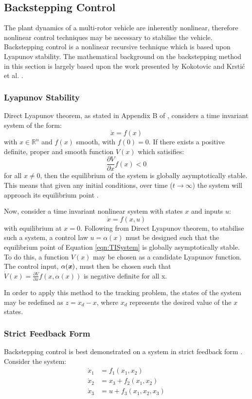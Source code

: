 \subsection{Backstepping Control}\label{section:BacksteppingBackground}
The plant dynamics of a multi-rotor vehicle are inherently nonlinear, therefore nonlinear control techniques may be necessary to stabilise the vehicle. Backstepping control is a nonlinear recursive technique which is based upon Lyapunov stability. The mathematical background on the backstepping method in this section is largely based upon the work presented by Kokotovic \cite{1992a} and Krsti\'c et al. \cite{Krstic1995}.

\subsubsection{Lyapunov Stability}
Direct Lyapunov theorem, as stated in Appendix B of \cite{Isidori1995}, considers a time invariant system of the form:
\[\dot{x}=f(x)\]
with $x\in\mathbb{R}^{n}$ and $f(x)$ smooth, with $f(0)=0$. If there exists a positive definite, proper and smooth function $V(x)$ which satisifies:
\[\frac{\partial V}{\partial x}f(x)<0\]
for all $x\neq0$, then the equilibrium of the system is globally asymptotically stable. This means that given any initial conditions, over time ($t\rightarrow\infty$) the system will approach its equilibrium point \cite{Chen1999}. 

Now, consider a time invariant nonlinear system with states $x$ and inputs $u$:
\begin{equation}\label{eqn:TISystem}
\dot{x}=f(x,u)
\end{equation}
with equilibrium at $x=0$. Following from Direct Lyapunov theorem, to stabilise such a system, a control law $u=\alpha(x)$ must be designed such that the equilibrium point of Equation \ref{eqn:TISystem} is globally asymptotically stable. To do this, a function $V(x)$ may be chosen as a candidate Lyapunov function. The control input, $\alpha(\textbf{\textit{x}})$, must then be chosen such that $\dot{V}(x)=\frac{\partial V}{\partial x}f(x,\alpha(x))$ is negative definite for all x. 

In order to apply this method to the tracking problem, the states of the system may be redefined as $z=x_{d}-x$, where $x_{d}$ represents the desired value of the $x$ states.

\subsubsection{Strict Feedback Form}
Backstepping control is best demonstrated on a system in strict feedback form \cite{1992a}. Consider the system:
\begin{equation*}
\begin{split}
\dot{x}_{1}&=f_{1}(x_{1},x_{2})\\
\dot{x}_{2}&=x_{3}+f_{2}(x_{1},x_{2})\\
\dot{x}_{3}&=u +f_{3}(x_{1},x_{2}, x_{3})
\end{split}
\end{equation*}


